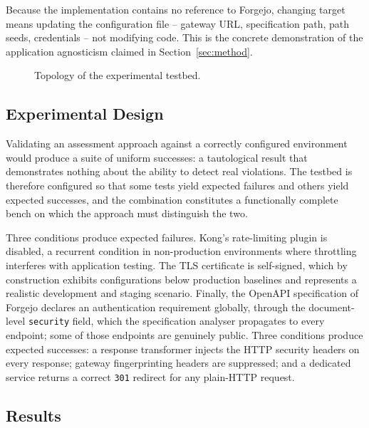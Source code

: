\documentclass[
]{ceurart}
\begin{document}
Because the implementation contains no reference to Forgejo, changing target means updating the configuration file -- gateway URL, specification path, path seeds, credentials -- not modifying code.
This is the concrete demonstration of the application agnosticism claimed in Section~\ref{sec:method}.

\begin{figure}[t]
  \centering
  \caption{Topology of the experimental testbed.}
  \label{fig:testbed}
\end{figure}

\subsection{Experimental Design}

Validating an assessment approach against a correctly configured environment would produce a suite of uniform successes: a tautological result that demonstrates nothing about the ability to detect real violations.
The testbed is therefore configured so that some tests yield expected failures and others yield expected successes, and the combination constitutes a functionally complete bench on which the approach must distinguish the two.

Three conditions produce expected failures.
Kong's rate-limiting plugin is disabled, a recurrent condition in non-production environments where throttling interferes with application testing.
The TLS certificate is self-signed, which by construction exhibits configurations below production baselines and represents a realistic development and staging scenario.
Finally, the OpenAPI specification of Forgejo declares an authentication requirement globally, through the document-level \texttt{security} field, which the specification analyser propagates to every endpoint; some of those endpoints are genuinely public.
Three conditions produce expected successes: a response transformer injects the HTTP security headers on every response; gateway fingerprinting headers are suppressed; and a dedicated service returns a correct \texttt{301} redirect for any plain-HTTP request.

\subsection{Results}
\end{document}
